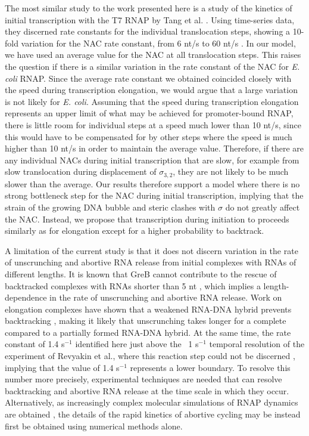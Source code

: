 The most similar study to the work presented here is a study of the kinetics
of initial transcription with the T7 RNAP by Tang et al.
\cite{tang_real-time_2009}. Using time-series data, they discerned rate
constants for the individual translocation steps, showing a 10-fold variation
for the NAC rate constant, from 6 nt/s to 60 nt/s
\cite{tang_real-time_2009}. In our model, we have used an average value for
the NAC at all translocation steps. This raises the question if there is a
similar variation in the rate constant of the NAC for \textit{E. coli} RNAP.
Since the average rate constant we obtained coincided closely with the speed
during transcription elongation, we would argue that a large variation is
not likely for \textit{E. coli}. Assuming that the speed during transcription
elongation represents an upper limit of what may be achieved for
promoter-bound RNAP, there is little room for individual steps at a speed much
lower than 10 nt/s, since this would have to be compensated for by other
steps where the speed is much higher than 10 nt/s in order to maintain the
average value. Therefore, if there are any individual NACs during initial
transcription that are slow, for example from slow translocation during
displacement of $\sigma_{3,2}$, they are not likely to be much slower than the
average. Our results therefore support a model where there is no strong
bottleneck step for the NAC during initial transcription, implying that the
strain of the growing DNA bubble and steric clashes with $\sigma$ do not
greatly affect the NAC. Instead, we propose that transcription during
initiation to proceeds similarly as for elongation except for a higher
probability to backtrack.


A limitation of the current study is that it does not discern variation in the
rate of unscrunching and abortive RNA release from initial complexes with RNAs
of different lengths. It is known that GreB cannot contribute to the rescue of
backtracked complexes with RNAs shorter than 5 nt \cite{hsu_initial_2006},
which implies a length-dependence in the rate of unscrunching and abortive RNA
release. Work on elongation complexes have shown that a weakened RNA-DNA
hybrid prevents backtracking \cite{nudler_rnadna_1997}, making it likely that
unscrunching takes longer for a complete compared to a partially formed
RNA-DNA hybrid. At the same time, the rate constant of 1.4 s$^{-1}$ identified
here just above the ~1 s$^{-1}$ temporal resolution of the experiment of
Revyakin et al., where this reaction step could not be discerned
\cite{revyakin_abortive_2006}, implying that the value of 1.4 s$^{-1}$
represents a lower boundary. To resolve this number more precisely,
experimental techniques are needed that can resolve backtracking and abortive
RNA release at the time scale in which they occur. Alternatively, as
increasingly complex molecular simulations of RNAP dynamics are obtained
\cite{silva_millisecond_2014}, the details of the rapid kinetics of abortive
cycling may be instead first be obtained using numerical methods alone.

